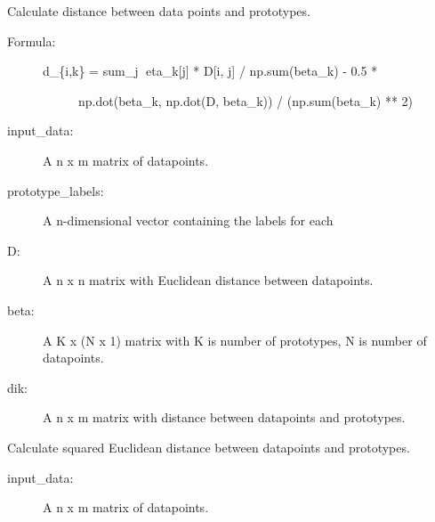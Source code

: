 \documentclass[letterpaper,10pt,english]{sphinxmanual}
\begin{document}
\begin{fulllineitems}

\begin{fulllineitems}
\label{\detokenize{index:lmlvq_distance.LMLVQ.d_i_k}}
Calculate distance between data points and prototypes.
\begin{description}
\item[{Formula:}] \leavevmode\begin{description}
\item[{d\_\{i,k\} = sum\_j eta\_k{[}j{]} * D{[}i, j{]} / np.sum(beta\_k) - 0.5 *}] \leavevmode
np.dot(beta\_k, np.dot(D, beta\_k)) / (np.sum(beta\_k) ** 2)

\end{description}

\end{description}
\begin{description}
\item[{input\_data:}] \leavevmode
A n x m matrix of datapoints.

\item[{prototype\_labels:}] \leavevmode
A n-dimensional vector containing the labels for each

\item[{D:}] \leavevmode
A n x n matrix with Euclidean distance between datapoints.

\item[{beta:}] \leavevmode
A K x (N x 1) matrix with K is number of prototypes, N is number
of datapoints.

\end{description}
\begin{description}
\item[{dik:}] \leavevmode
A n x m matrix with distance between datapoints and
prototypes.

\end{description}

\end{fulllineitems}


\begin{fulllineitems}
\label{\detokenize{index:lmlvq_distance.LMLVQ.euclidean_dist}}
Calculate squared Euclidean distance between datapoints and
prototypes.
\begin{description}
\item[{input\_data:}] \leavevmode
A n x m matrix of datapoints.


\end{description}
\end{fulllineitems}
\end{fulllineitems}
\end{document}

